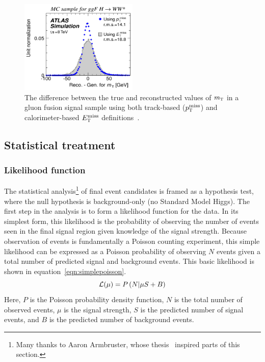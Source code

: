 \begin{figure}[h!]
  \centering
  \captionsetup{justification=centering}

  \includegraphics[width=0.5\textwidth]{figures/mT_resolution}
  \caption{The difference between the true and reconstructed values of $m_{\textrm{\footnotesize\sc t}}$ in a gluon fusion signal sample using both track-based ($p_{\textrm{\footnotesize\sc t}}^{\rm miss}$) and calorimeter-based $E_{\textrm{\footnotesize\sc t}}^{\rm miss}$ definitions~\cite{WW2015}.}
  \label{fig:mTresolution}
\end{figure}

\subsection{Statistical treatment}
\label{sec:ww_stats}

\subsubsection{Likelihood function}

The statistical analysis\footnote{Many thanks to Aaron Armbruster, whose thesis~\cite{ArmbrusterThesis} inspired parts of this section.} of final event candidates is framed as a hypothesis test, where the null hypothesis is background-only (no Standard Model Higgs). The first step in the analysis is to form a likelihood function for the data. In its simplest form, this likelihood is the probability of observing the number of events seen in the final signal region given knowledge of the signal strength. Because observation of events is fundamentally a Poisson counting experiment, this simple likelihood can be expressed as a Poisson probability of observing $N$ events given a total number of predicted signal and background events. This basic likelihood is shown in equation~\ref{eqn:simplepoisson}.
%
\begin{equation}
\mathcal{L}(\mu) = P\left(N | \mu S + B\right)
\label{eqn:simplepoisson}
\end{equation}
%
Here, $P$ is the Poisson probability density function, $N$ is the total number of observed events, $\mu$ is the signal strength, $S$ is the predicted number of signal events, and $B$ is the predicted number of background events. 

